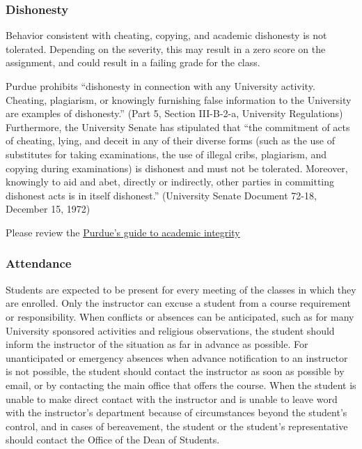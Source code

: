 \documentclass{article}
\begin{document}
\hypertarget{dishonesty_21}{}\subsubsection*{{Dishonesty}}\label{dishonesty_21}

Behavior consistent with cheating, copying, and academic dishonesty is not tolerated. Depending on the severity, this may result in a zero score on the assignment, and could result in a failing grade for the class.

Purdue prohibits ``{}dishonesty in connection with any University activity. Cheating, plagiarism, or knowingly furnishing false information to the University are examples of dishonesty.''{} (Part 5, Section III-B-2-a, University Regulations) Furthermore, the University Senate has stipulated that ``{}the commitment of acts of cheating, lying, and deceit in any of their diverse forms (such as the use of substitutes for taking examinations, the use of illegal cribs, plagiarism, and copying during examinations) is dishonest and must not be tolerated. Moreover, knowingly to aid and abet, directly or indirectly, other parties in committing dishonest acts is in itself dishonest.''{} (University Senate Document 72-18, December 15, 1972)

Please review the \href{http://www.purdue.edu/odos/aboutodos/academicintegrity.php}{Purdue'{}s guide to academic integrity}

\hypertarget{attendance_22}{}\subsubsection*{{Attendance}}\label{attendance_22}

Students are expected to be present for every meeting of the classes in which they are enrolled. Only the instructor can excuse a student from a course requirement or responsibility. When conflicts or absences can be anticipated, such as for many University sponsored activities and religious observations, the student should inform the instructor of the situation as far in advance as possible. For unanticipated or emergency absences when advance notification to an instructor is not possible, the student should contact the instructor as soon as possible by email, or by contacting the main office that offers the course. When the student is unable to make direct contact with the instructor and is unable to leave word with the instructor'{}s department because of circumstances beyond the student'{}s control, and in cases of bereavement, the student or the student'{}s representative should contact the Office of the Dean of Students.
\end{document}
